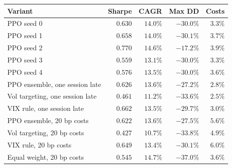 \begin{tabular}{lrrrr}
\toprule
Variant & Sharpe & CAGR & Max DD & Costs \\
\midrule
PPO seed 0 & $0.630$ & $14.0\%$ & $-30.0\%$ & $3.3\%$ \\
PPO seed 1 & $0.658$ & $14.0\%$ & $-30.1\%$ & $3.7\%$ \\
PPO seed 2 & $0.770$ & $14.6\%$ & $-17.2\%$ & $3.9\%$ \\
PPO seed 3 & $0.559$ & $13.1\%$ & $-30.0\%$ & $3.3\%$ \\
PPO seed 4 & $0.576$ & $13.5\%$ & $-30.0\%$ & $3.6\%$ \\
\midrule
PPO ensemble, one session late & $0.626$ & $13.6\%$ & $-27.2\%$ & $2.8\%$ \\
Vol targeting, one session late & $0.461$ & $11.2\%$ & $-33.6\%$ & $2.5\%$ \\
VIX rule, one session late & $0.662$ & $13.5\%$ & $-29.7\%$ & $3.0\%$ \\
\midrule
PPO ensemble, 20 bp costs & $0.622$ & $13.6\%$ & $-27.5\%$ & $5.6\%$ \\
Vol targeting, 20 bp costs & $0.427$ & $10.7\%$ & $-33.8\%$ & $4.9\%$ \\
VIX rule, 20 bp costs & $0.649$ & $13.4\%$ & $-30.1\%$ & $6.0\%$ \\
Equal weight, 20 bp costs & $0.545$ & $14.7\%$ & $-37.0\%$ & $3.6\%$ \\
\bottomrule
\end{tabular}
